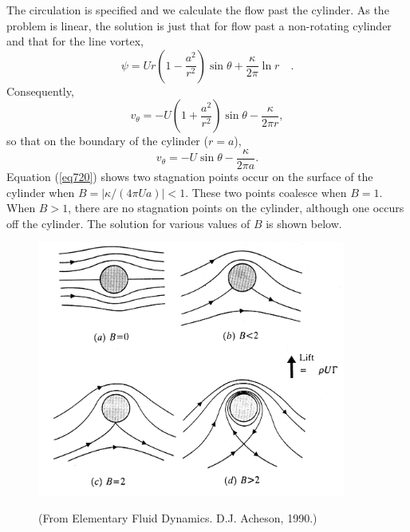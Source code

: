 \documentclass[twoside,a4paper,11pt]{report}
\begin{document}
The circulation is specified and we calculate the flow past the cylinder. As 
the problem is linear, the solution is just that for flow past a 
non-rotating cylinder and that for the line vortex,
\begin{equation}
\label{eq718}
\psi =Ur\left( {1-\frac{a^2}{r^2}} \right)\sin \theta +\frac{\kappa }{2\pi 
}\ln r\quad .
\end{equation}
Consequently, 
\[ v_\theta =-U\left( {1+\frac{a^2}{r^2}} \right)\sin \theta 
-\frac{\kappa }{2\pi r}, \label{eq719} \]
so that on the boundary of the cylinder ($r = a$), 
\begin{equation}
v_\theta =-U\sin \theta 
-\frac{\kappa }{2\pi a}. \label{eq720} \end{equation}
Equation (\ref{eq720}) shows two stagnation points occur on the surface of the 
cylinder when $B=\left| {\kappa / {\left( {4\pi Ua} 
\right)}} \right|<1$. These two points coalesce when $B = 1$. When $B > 1$, 
there are no stagnation points on the cylinder, although one occurs off the 
cylinder. The solution for various values of $B$ is shown below.

\begin{figure}[htbp]
\centerline{\includegraphics[width=4in]{Section77.pdf}}
{\small (From Elementary Fluid Dynamics. D.J. Acheson, 1990.)}
\label{fig7}
\end{figure}
\end{document}

